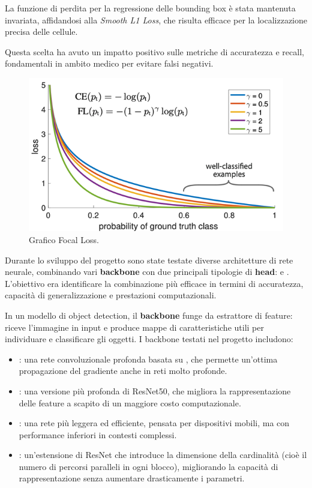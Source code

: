 \documentclass[minted, draw]{../tex/hebdomon}
\begin{document}
La funzione di perdita per la regressione delle bounding box è stata mantenuta invariata, affidandosi alla \textit{Smooth L1 Loss}, che risulta efficace per la localizzazione precisa delle cellule.

Questa scelta ha avuto un impatto positivo sulle metriche di accuratezza e recall, fondamentali in ambito medico per evitare falsi negativi.


%
\begin{figure}[H]
	\centering
	\includegraphics[width=.6\linewidth]{figures/focal_loss.png}
	\caption{Grafico Focal Loss.}
	\label{fig:focal_loss}
\end{figure}
%


Durante lo sviluppo del progetto sono state testate diverse architetture di rete neurale, combinando vari \textbf{backbone} con due principali tipologie di \textbf{head}:  e . L’obiettivo era identificare la combinazione più efficace in termini di accuratezza, capacità di generalizzazione e prestazioni computazionali.

In un modello di object detection, il \textbf{backbone} funge da estrattore di feature: riceve l’immagine in input e produce mappe di caratteristiche utili per individuare e classificare gli oggetti. I backbone testati nel progetto includono:

\begin{itemize}
	\item {}: una rete convoluzionale profonda basata su , che permette un’ottima propagazione del gradiente anche in reti molto profonde.
	\item {}: una versione più profonda di ResNet50, che migliora la rappresentazione delle feature a scapito di un maggiore costo computazionale.
	\item {}: una rete più leggera ed efficiente, pensata per dispositivi mobili, ma con performance inferiori in contesti complessi. 
	\item {}: un’estensione di ResNet che introduce la dimensione della cardinalità (cioè il numero di percorsi paralleli in ogni blocco), migliorando la capacità di rappresentazione senza aumentare drasticamente i parametri.
\end{itemize}
\end{document}

